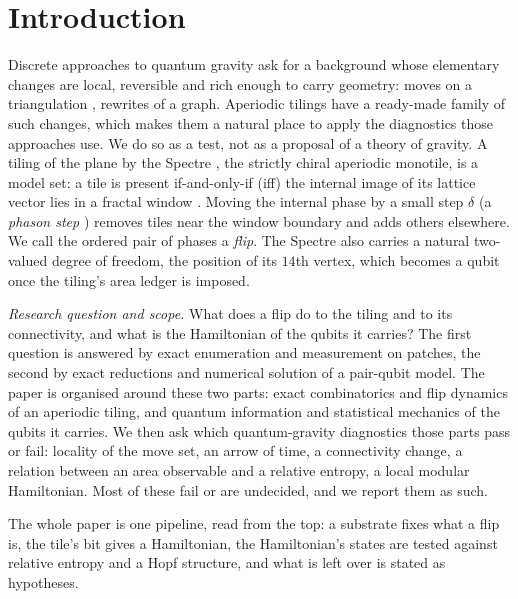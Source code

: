 \documentclass[11pt]{article}
\theoremstyle{definition}
\begin{document}
\section{Introduction}\label{sec:intro}
Discrete approaches to quantum gravity ask for a background whose elementary changes are local, reversible and rich enough to carry geometry: moves on a triangulation \cite{pachner1991}, rewrites of a graph. Aperiodic tilings have a ready-made family of such changes, which makes them a natural place to apply the diagnostics those approaches use. We do so as a test, not as a proposal of a theory of gravity. A tiling of the plane by the Spectre \cite{smith2023}, the strictly chiral aperiodic monotile, is a model set: a tile is present if-and-only-if (iff) the internal image of its lattice vector lies in a fractal window \cite{bgms}. Moving the internal phase by a small step $\delta$ (a \emph{phason step} \cite{socolar1986}) removes tiles near the window boundary and adds others elsewhere. We call the ordered pair of phases a \emph{flip}. The Spectre also carries a natural two-valued degree of freedom, the position of its $14$th vertex, which becomes a qubit once the tiling's area ledger is imposed.

\emph{Research question and scope.} What does a flip do to the tiling and to its connectivity, and what is the Hamiltonian of the qubits it carries? The first question is answered by exact enumeration and measurement on patches, the second by exact reductions and numerical solution of a pair-qubit model. The paper is organised around these two parts: exact combinatorics and flip dynamics of an aperiodic tiling, and quantum information and statistical mechanics of the qubits it carries. We then ask which quantum-gravity diagnostics those parts pass or fail: locality of the move set, an arrow of time, a connectivity change, a relation between an area observable and a relative entropy, a local modular Hamiltonian. Most of these fail or are undecided, and we report them as such.

The whole paper is one pipeline, read from the top: a substrate fixes what a flip is, the tile's bit gives a Hamiltonian, the Hamiltonian's states are tested against relative entropy and a Hopf structure, and what is left over is stated as hypotheses.
\end{document}

